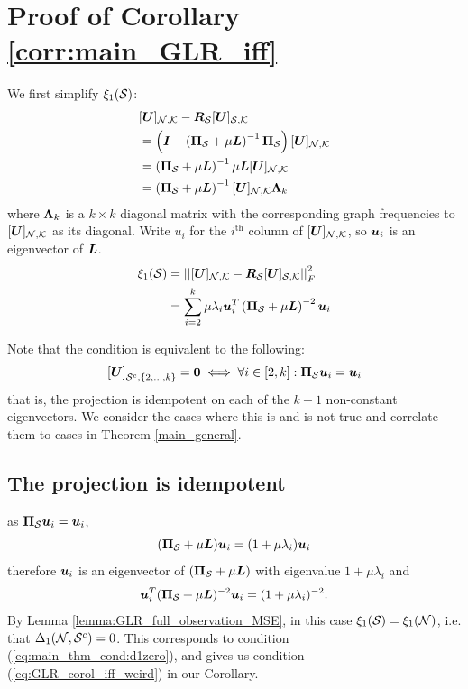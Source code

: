\section{Proof of Corollary \ref{corr:main_GLR_iff}}
\label{app:proof_main_GLR_iff}
We first simplify $\xi_{1}(\mathcal{S})$:
\begin{align}
    &\matrsubU{N} - \matr{R}_{\set{S}}\matrsubU{S} \\
    &= \left(\matr{I} - \left(\proj{S} + \mu\matr{L} \right)^{-1}\proj{S}\right)\matrsubU{N}  \\
    &=  \left(\proj{S} + \mu\matr{L} \right)^{-1}\mu\matr{L}\matrsubU{N} \\
    &=  \left(\proj{S} + \mu\matr{L} \right)^{-1}\matrsubU{N}\matr{\Lambda}_{k}
\end{align}
where $\bm{\Lambda}_{k}$ is a $k \times k$ diagonal matrix with the corresponding graph frequencies to $\matrsubU{N}$ as its diagonal. Write $u_{i}$ for the $i^{\textrm{th}}$ column of $\matrsubU{N}$, so $\bm{u}_{i}$ is an eigenvector of $\bm{L}$. 
\begin{align}
    \xi_{1}(\set{S}) &= \sqfrob{\matrsubU{N} - \matr{R}_{\set{S}}\matrsubU{S}}  \\
    &= \sum_{i=2}^{k} \mu\lambda_{i}\vect{u}_{i}^{T}\left(\proj{S} + \mu\matr{L} \right)^{-2}\vect{u}_{i} \label{eq:GLR_corr_proof:xi_1_def}
\end{align}

Note that the condition is equivalent to the following:
\begin{equation}
    \msubgen[\set{S}^{c},\{2,\ldots,k\}]{\matr{U}} = \matr{0} \iff \forall i \in [2,k]: \proj{S}\vect{u}_{i} = \vect{u}_{i}
\end{equation}
that is, the projection is idempotent on each of the $k-1$ non-constant eigenvectors. We consider the cases where this is and is not true and correlate them to cases in Theorem \ref{main_general}.

\subsection{The projection is idempotent}
\label{subapp:GLR_iff_proof:idempotent}
as $\proj{S}\vect{u}_{i} = \vect{u}_{i}$,
\begin{equation}
   (\proj{S} + \mu \matr{L})\vect{u}_{i} = (1 + \mu\lambda_{i})\vect{u}_{i} 
\end{equation}
therefore $\bm{u}_{i}$ is an eigenvector of $(\proj{S} + \mu \matr{L})$ with eigenvalue $1 + \mu\lambda_{i}$ and
\begin{align}
    \vect{u}_{i}^{T}(\proj{S} + \mu \matr{L})^{-2}\vect{u}_{i} = (1 + \mu\lambda_{i})^{-2}.
\end{align}
By Lemma \ref{lemma:GLR_full_observation_MSE}, in this case $\xi_{1}(\mathcal{S}) = \xi_{1}(\mathcal{N})$, i.e. that $\Delta_{1}(\mathcal{N},\mathcal{S}^{c}) = 0$. This corresponds to condition (\ref{eq:main_thm_cond:d1zero}), and gives us condition (\ref{eq:GLR_corol_iff_weird}) in our Corollary.
